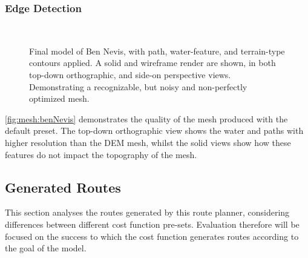 \documentclass[12pt]{article}
\begin{document}
\subsubsection{Edge Detection}

\begin{figure}[H]
  \centering
  \\
  \caption{Final model of Ben Nevis, with path, water-feature, and terrain-type contours applied. A solid and wireframe render are shown, in both top-down orthographic, and side-on perspective views. Demonstrating a recognizable, but noisy and non-perfectly optimized mesh.}\label{fig:mesh:benNevis}
\end{figure}

\autoref{fig:mesh:benNevis} demonstrates the quality of the mesh produced with the default preset. The top-down orthographic view shows the water and paths with higher resolution than the DEM mesh, whilst the solid views show how these features do not impact the topography of the mesh.

\subsection{Generated Routes}

This section analyses the routes generated by this route planner, considering differences between different cost function pre-sets. Evaluation therefore will be focused on the success to which the cost function generates routes according to the goal of the model.
\end{document}
